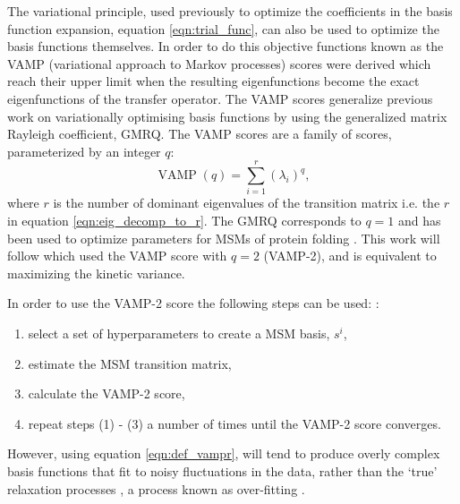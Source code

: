 The variational principle, used previously to optimize the coefficients in the basis function expansion, equation \ref{eqn:trial_func}, can also be used to optimize the basis functions themselves.  \cite{schererVariationalSelectionFeatures2019}\cite{husicOptimizedParameterSelection2016} In order to do this objective functions known as the VAMP (variational approach to Markov processes) scores \cite{wuVariationalApproachLearning2019} were derived which reach their upper limit when the resulting eigenfunctions become the exact eigenfunctions of the transfer operator. The VAMP scores generalize previous work on variationally optimising basis functions by \cite{mcgibbonVariationalCrossvalidationSlow2015} using the generalized matrix Rayleigh coefficient, GMRQ. The VAMP scores are a family of scores, parameterized by an integer $q$: \cite{wuVariationalApproachLearning2020c}
\begin{equation}\label{eqn:def_vampr}
\operatorname{VAMP}(q)=\sum_{i=1}^{r}\left(\lambda_{i}\right)^{q}, 
\end{equation} 
where $r$ is the number of dominant eigenvalues of the transition matrix i.e. the $r$ in equation \ref{eqn:eig_decomp_to_r}. The GMRQ corresponds to $q=1$ and has been used to optimize parameters for MSMs of protein folding \cite{husicOptimizedParameterSelection2016}. This work will follow \cite{schererVariationalSelectionFeatures2019} which used the VAMP  score with $q=2$ (VAMP-2), and is equivalent to maximizing the kinetic variance. \cite{wuVariationalApproachLearning2020c}

In order to use the VAMP-2 score the following steps can be used:  \cite{schererVariationalSelectionFeatures2019}:
\begin{enumerate}
    \item select a set of hyperparameters to create a MSM basis, $s^{i}$, 
    \item estimate the MSM transition matrix, 
    \item calculate the VAMP-2 score, 
    \item repeat steps (1) - (3) a number of times until the VAMP-2 score converges. 
\end{enumerate}
However, using equation \ref{eqn:def_vampr}, will tend to produce overly complex basis functions that fit to noisy fluctuations in the data, rather than the `true' relaxation processes \cite{mcgibbonVariationalCrossvalidationSlow2015}\cite{wuVariationalApproachLearning2020c}\cite{schererVariationalSelectionFeatures2019}, a process known as over-fitting \cite{friedman2001elements}.

